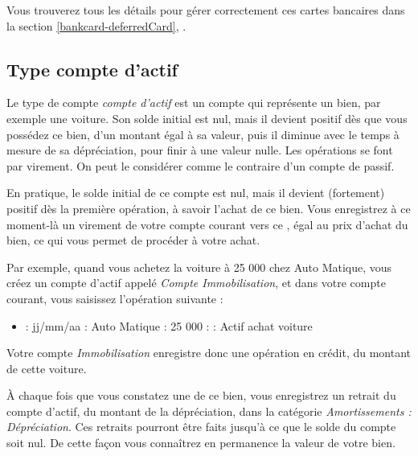 Vous trouverez tous les détails pour gérer correctement ces cartes bancaires dans la section \vref{bankcard-deferredCard}, .


\subsection{Type compte d'actif\label{accounts-type-assets}}

Le type de compte \emph{compte d'actif} est un compte qui représente un bien, par exemple une voiture. Son solde initial est nul, mais il devient positif dès que vous possédez ce bien, d'un montant égal à sa valeur, puis il diminue avec le temps à mesure de sa dépréciation, pour finir à une valeur nulle. Les opérations se font par virement. On peut le considérer comme le  contraire d'un compte de passif.

En pratique, le solde initial de ce compte est nul, mais il devient (fortement) positif dès la première opération, à savoir l'achat de ce bien. Vous enregistrez à ce moment-là un virement de votre compte courant vers ce , égal au prix d'achat du bien, ce qui vous permet de procéder à votre achat.

Par exemple, quand vous achetez la voiture à 25 000 chez Auto Matique, vous créez un compte d'actif appelé \emph{Compte Immobilisation}, et dans votre compte courant, vous saisissez l'opération suivante : 

\begin{itemize}
	\item {} : jj/mm/aa   : Auto Matique   : 25 000   :    : Actif achat voiture
\end{itemize}

Votre compte \emph{Immobilisation} enregistre donc une opération en crédit, du montant de cette voiture.

À chaque fois que vous constatez une  de ce bien, vous enregistrez un retrait du compte d'actif, du montant de la dépréciation, dans la catégorie \emph{Amortissements : Dépréciation}. Ces retraits pourront être faits jusqu'à ce que le solde du compte soit nul. De cette façon vous connaîtrez en permanence la valeur de votre bien.

